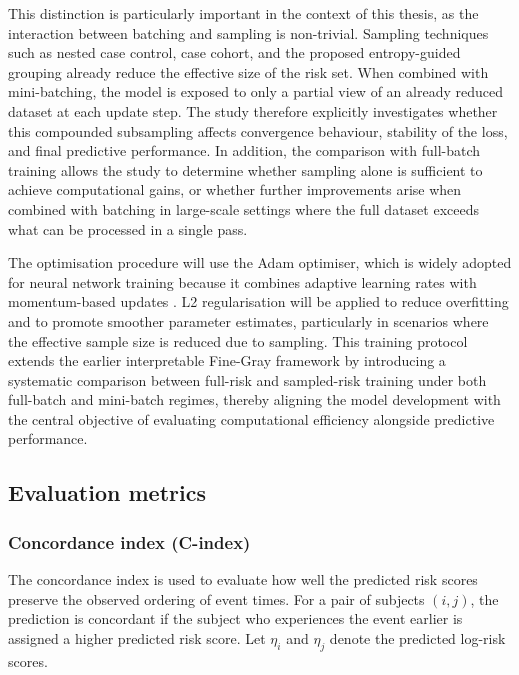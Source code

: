 \documentclass[a4paper,twoside,12pt]{report}
\begin{document}
This distinction is particularly important in the context of this thesis, as the interaction between batching and sampling is non-trivial. Sampling techniques such as nested case control, case cohort, and the proposed entropy-guided grouping already reduce the effective size of the risk set. When combined with mini-batching, the model is exposed to only a partial view of an already reduced dataset at each update step. The study therefore explicitly investigates whether this compounded subsampling affects convergence behaviour, stability of the loss, and final predictive performance. In addition, the comparison with full-batch training allows the study to determine whether sampling alone is sufficient to achieve computational gains, or whether further improvements arise when combined with batching in large-scale settings where the full dataset exceeds what can be processed in a single pass.

The optimisation procedure will use the Adam optimiser, which is widely adopted for neural network training because it combines adaptive learning rates with momentum-based updates \cite{kingma2014adam}. L2 regularisation will be applied to reduce overfitting and to promote smoother parameter estimates, particularly in scenarios where the effective sample size is reduced due to sampling. This training protocol extends the earlier interpretable Fine-Gray framework \cite{InterpretableFineGray2025} by introducing a systematic comparison between full-risk and sampled-risk training under both full-batch and mini-batch regimes, thereby aligning the model development with the central objective of evaluating computational efficiency alongside predictive performance.

\subsection{Evaluation metrics}

\subsubsection{Concordance index (C-index)}

The concordance index is used to evaluate how well the predicted risk scores preserve the observed ordering of event times. For a pair of subjects $(i,j)$, the prediction is concordant if the subject who experiences the event earlier is assigned a higher predicted risk score. Let $\eta_i$ and $\eta_j$ denote the predicted log-risk scores.
\end{document}
